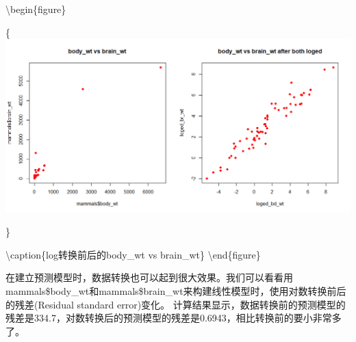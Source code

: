 \documentclass[
]{article}
\begin{document}
\textbackslash begin\{figure\}

\{\centering \includegraphics[width=0.99\linewidth,height=0.99\textheight]{image/badywtVSbrainwt}

\}

\textbackslash caption\{log转换前后的body\_wt vs brain\_wt\}\label{fig:bbwtlog}
\textbackslash end\{figure\}

在建立预测模型时，数据转换也可以起到很大效果。我们可以看看用mammals\$body\_wt和mammals\$brain\_wt来构建线性模型时，使用对数转换前后的残差(Residual standard error)变化。
计算结果显示，数据转换前的预测模型的残差是334.7，对数转换后的预测模型的残差是0.6943，相比转换前的要小非常多了。
\end{document}
